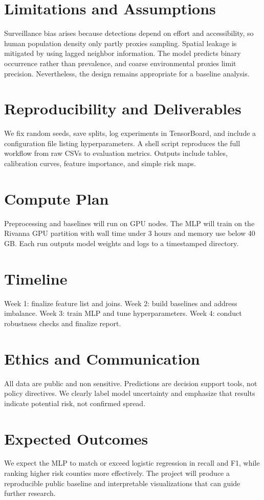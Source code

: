 \documentclass[conference]{IEEEtran}
\begin{document}
\section{Limitations and Assumptions}
Surveillance bias arises because detections depend on effort and accessibility, so human population density only partly proxies sampling. Spatial leakage is mitigated by using lagged neighbor information. The model predicts binary occurrence rather than prevalence, and coarse environmental proxies limit precision. Nevertheless, the design remains appropriate for a baseline analysis.

\section{Reproducibility and Deliverables}
We fix random seeds, save splits, log experiments in TensorBoard, and include a configuration file listing hyperparameters. A shell script reproduces the full workflow from raw CSVs to evaluation metrics. Outputs include tables, calibration curves, feature importance, and simple risk maps.

\section*{Compute Plan}
Preprocessing and baselines will run on GPU nodes. The MLP will train on the Rivanna GPU partition with wall time under 3 hours and memory use below 40 GB. Each run outputs model weights and logs to a timestamped directory.

\section*{Timeline}
Week 1: finalize feature list and joins.  
Week 2: build baselines and address imbalance.  
Week 3: train MLP and tune hyperparameters.  
Week 4: conduct robustness checks and finalize report.

\section*{Ethics and Communication}
All data are public and non sensitive. Predictions are decision support tools, not policy directives. We clearly label model uncertainty and emphasize that results indicate potential risk, not confirmed spread.

\section*{Expected Outcomes}
We expect the MLP to match or exceed logistic regression in recall and F1, while ranking higher risk counties more effectively. The project will produce a reproducible public baseline and interpretable visualizations that can guide further research.
\end{document}
